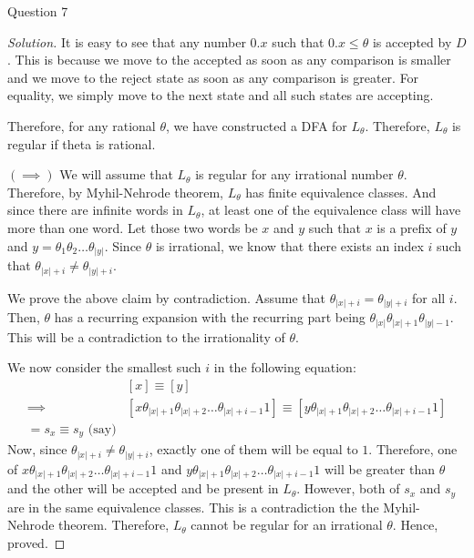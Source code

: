 \begin{solution}{Question 7}
\begin{proof}[Solution]
      It is easy to see that any number $0.x$ such that $0.x \leq \theta$ is accepted by $D$. This is because we move to the accepted as soon as any comparison is smaller and we move to the reject state as soon as any comparison is greater. For equality, we simply move to the next state and all such states are accepting.\par
      Therefore, for any rational $\theta$, we have constructed a DFA for $L_\theta$. Therefore, $L_\theta$ is regular if theta is rational.\par
      $(\implies)$ We will assume that $L_\theta$ is regular for any irrational number $\theta$. Therefore, by Myhil-Nehrode theorem, $L_\theta$ has finite equivalence classes. And since there are infinite words in $L_\theta$, at least one of the equivalence class will have more than one word. Let those two words be $x$ and $y$ such that $x$ is a prefix of $y$ and $y = \theta_1\theta_2\ldots\theta_{|y|}$. Since $\theta$ is irrational, we know that there exists an index $i$ such that $\theta_{|x|+i} \neq \theta_{|y|+i}$.\par
      We prove the above claim by contradiction. Assume that $\theta_{|x|+i} = \theta_{|y|+i}$ for all $i$. Then, $\theta$ has a recurring expansion with the recurring part being $\theta_{|x|}\theta_{|x|+1}\theta_{|y|-1}$. This will be a contradiction to the irrationality of $\theta$.\par
      We now consider the smallest such $i$ in the following equation:
      \begin{equation}
        \begin{split}
            &[x] \equiv [y]\\
            \implies &[x\theta_{|x|+1}\theta_{|x|+2}\ldots\theta_{|x|+i-1}1] \equiv [y\theta_{|x|+1}\theta_{|x|+2}\ldots\theta_{|x|+i-1}1]\\
            = s_x \equiv s_y\text{ (say)}
        \end{split}
      \end{equation}
      Now, since $\theta_{|x|+i} \neq \theta_{|y|+i}$, exactly one of them will be equal to $1$. Therefore, one of $x\theta_{|x|+1}\theta_{|x|+2}\ldots\theta_{|x|+i-1}1$ and $y\theta_{|x|+1}\theta_{|x|+2}\ldots\theta_{|x|+i-1}1$ will be greater than $\theta$ and the other will be accepted and be present in $L_\theta$. However, both of $s_x$ and $s_y$ are in the same equivalence classes. This is a contradiction the the Myhil-Nehrode theorem. Therefore, $L_\theta$ cannot be regular for an irrational $\theta$. Hence, proved.
    \end{proof}
\end{solution}
